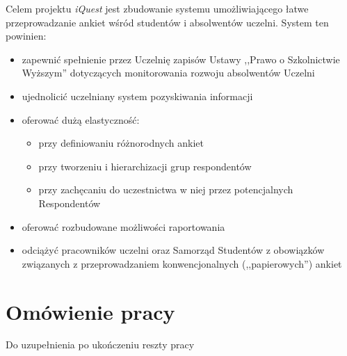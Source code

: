 Celem projektu \textit{iQuest} jest zbudowanie systemu umożliwiającego łatwe przeprowadzanie ankiet wśród studentów i absolwentów uczelni. System ten powinien:
\begin{itemize}
\item{zapewnić spełnienie przez Uczelnię zapisów Ustawy ,,Prawo o Szkolnictwie Wyższym'' dotyczących monitorowania rozwoju absolwentów Uczelni\cite{AP:PoSW05}}
\item{ujednolicić uczelniany system pozyskiwania informacji}
\item{oferować dużą elastyczność:
\begin{itemize}
\item{przy definiowaniu różnorodnych ankiet}
\item{przy tworzeniu i hierarchizacji grup respondentów}
\item{przy zachęcaniu do uczestnictwa w niej przez potencjalnych Respondentów}
\end{itemize}}
\item{oferować rozbudowane możliwości raportowania}
\item{odciążyć pracowników uczelni oraz Samorząd Studentów z obowiązków związanych z przeprowadzaniem konwencjonalnych (,,papierowych'') ankiet}
\end{itemize}

\section{Omówienie pracy}
\label{Chapter14}

{\color{red}Do uzupełnienia po ukończeniu reszty pracy}


